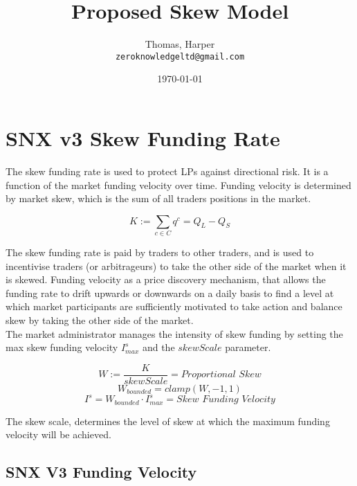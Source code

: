 \documentclass[]{article}
\title{Proposed Skew Model}
\author{
  Thomas, Harper\\
  \texttt{zeroknowledgeltd@gmail.com}
}
\date{\today}
\begin{document}
\maketitle

\section{SNX v3 Skew Funding Rate}

The skew funding rate is used to protect LPs against directional risk. It is a function of the market funding velocity over time. Funding velocity is determined by market skew, which is the sum of all traders positions in the market.

\begin{equation}
K := \sum_{c \in C}{q^c} = Q_L - Q_S
\end{equation}

The skew funding rate is paid by traders to other traders, and is used to incentivise traders (or arbitrageurs) to take the other side of the market when it is skewed. Funding velocity as a price discovery mechanism, that allows the funding rate to drift upwards or downwards on a daily basis to find a level at which market participants are sufficiently motivated to take action and balance skew by taking the other side of the market.\\

The market administrator manages the intensity of skew funding by setting the max skew funding velocity $I^s_{max}$ and the $skewScale$ parameter.

\begin{equation}
W := \frac{K}{skewScale} = \textit{Proportional Skew}
\end{equation}
\begin{equation}
W_{\textit{bounded}} = clamp(W, -1, 1)
\end{equation}
\begin{equation}
I^s = W_{\textit{bounded}}\cdot I^s_{max} = \textit{Skew Funding Velocity}
\end{equation}

The skew scale, determines the level of skew at which the maximum funding velocity will be achieved.

\subsection{SNX V3 Funding Velocity}

\end{document}
